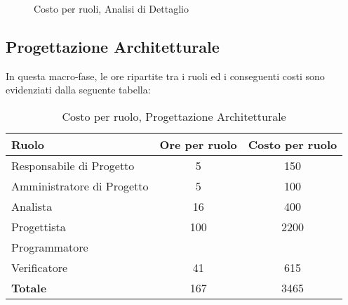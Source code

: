 \begin{figure}[h]
\centering
{}
\caption{Costo per ruoli, Analisi di Dettaglio}
\end{figure}
\newpage
\subsection{Progettazione Architetturale}
In questa macro-fase, le ore ripartite tra i ruoli ed i conseguenti costi sono evidenziati dalla seguente tabella:

\begin{table}[h]
\centering
\begin{tabular}{|l|c|c|}
	\toprule
	\textbf{Ruolo} & \textbf{Ore per ruolo} & \textbf{Costo per ruolo} \\
		
	\midrule
	Responsabile di Progetto & 5 & 150 \\
	Amministratore di Progetto & 5 & 100 \\ 
	Analista & 16 & 400 \\
	Progettista & 100 & 2200 \\
	Programmatore & & \\
	Verificatore & 41 & 615 \\
	\midrule
	\textbf{Totale} & 167 & 3465 \\
	
	\bottomrule
\end{tabular}
\caption{Costo per ruolo, Progettazione Architetturale}
\end{table}

